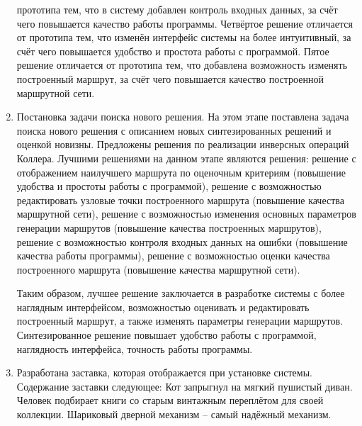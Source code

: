 \begin{enumerate}
        прототипа тем, что в систему добавлен контроль входных данных, за счёт чего повышается качество 
        работы программы. Четвёртое решение отличается от прототипа тем, что изменён интерфейс системы 
        на более интуитивный, за счёт чего повышается удобство и простота работы с программой. Пятое 
        решение отличается от прототипа тем, что добавлена возможность изменять построенный маршрут, за 
        счёт чего повышается качество построенной маршрутной сети.
    \item Постановка задачи поиска нового решения. На этом этапе поставлена задача поиска нового 
        решения с описанием новых синтезированных решений и оценкой новизны. Предложены решения по 
        реализации инверсных операций Коллера. Лучшими решениями на данном этапе являются решения: 
        решение с отображением наилучшего маршрута по оценочным критериям (повышение удобства и 
        простоты работы с программой), решение с возможностью редактировать узловые точки построенного 
        маршрута (повышение качества маршрутной сети), решение с возможностью изменения основных 
        параметров генерации маршрутов (повышение качества построенных маршрутов), решение с 
        возможностью контроля входных данных на ошибки (повышение качества работы программы), 
        решение с возможностью оценки качества построенного маршрута (повышение качества маршрутной 
        сети).

        Таким образом, лучшее решение заключается в разработке системы с более наглядным интерфейсом, 
        возможностью оценивать и редактировать построенный маршрут, а также изменять параметры 
        генерации маршрутов. Синтезированное решение повышает удобство работы с программой, 
        наглядность интерфейса, точность работы программы.
    \item Разработана заставка, которая отображается при установке системы. 
        Содержание заставки следующее: Кот запрыгнул на мягкий пушистый диван. Человек подбирает 
        книги со старым винтажным переплётом для своей коллекции. Шариковый дверной механизм -- 
        самый надёжный механизм.
\end{enumerate}